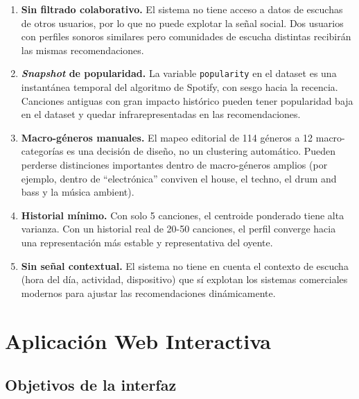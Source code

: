 \documentclass[12pt, a4paper]{book}
\theoremstyle{definition}
\begin{document}
\begin{enumerate}
  \item \textbf{Sin filtrado colaborativo.} El sistema no tiene acceso a
        datos de escuchas de otros usuarios, por lo que no puede explotar
        la señal social. Dos usuarios con perfiles sonoros similares pero
        comunidades de escucha distintas recibirán las mismas
        recomendaciones.

  \item \textbf{\textit{Snapshot} de popularidad.} La variable
        \texttt{popularity} en el dataset es una instantánea temporal del
        algoritmo de Spotify, con sesgo hacia la recencia. Canciones
        antiguas con gran impacto histórico pueden tener popularidad baja
        en el dataset y quedar infrarepresentadas en las recomendaciones.

  \item \textbf{Macro-géneros manuales.} El mapeo editorial de 114 géneros
        a 12 macro-categorías es una decisión de diseño, no un clustering
        automático. Pueden perderse distinciones importantes dentro de
        macro-géneros amplios (por ejemplo, dentro de ``electrónica'' conviven
        el house, el techno, el drum and bass y la música ambient).

  \item \textbf{Historial mínimo.} Con solo 5 canciones, el centroide
        ponderado tiene alta varianza. Con un historial real de 20-50
        canciones, el perfil converge hacia una representación más estable
        y representativa del oyente.

  \item \textbf{Sin señal contextual.} El sistema no tiene en cuenta el
        contexto de escucha (hora del día, actividad, dispositivo) que sí
        explotan los sistemas comerciales modernos para ajustar las
        recomendaciones dinámicamente.
\end{enumerate}

\chapter{Aplicación Web Interactiva}
\label{ch:app}

\section{Objetivos de la interfaz}
\end{document}
